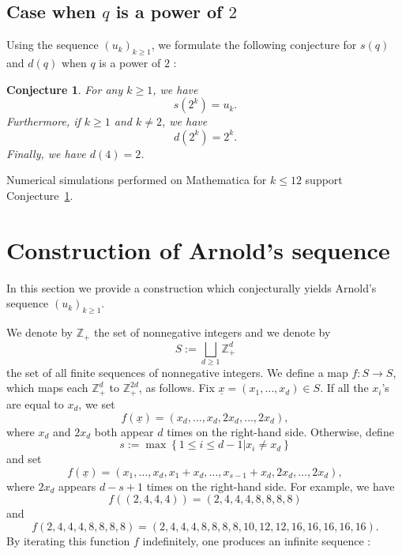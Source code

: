 \documentclass[12pt]{amsart}
\newcommand{\Z}{\mathbb Z}
\newtheorem{conj}{Conjecture}
\begin{document}
\subsection{Case when $q$ is a power of $2$}

Using the sequence $(u_k)_{k\geq1}$, we formulate the following conjecture for $s(q)$ and $d(q)$ when $q$ is a power of $2$ :

\begin{conj}
\label{conj:powersoftwo}
For any $k\geq 1$, we have
 \begin{equation}
 s(2^k)=u_k.
 \end{equation}
Furthermore, if $k\geq1$ and $k\neq2$, we have
\begin{equation}
d(2^k)= 2^k.
\end{equation}
Finally, we have $d(4)=2$.
\end{conj}
Numerical simulations performed on Mathematica for $k\leq 12$ support Conjecture~\ref{conj:powersoftwo}.

\section{Construction of Arnold's sequence}
\label{sec:Arnold}

In this section we provide a construction which conjecturally yields Arnold's sequence $(u_k)_{k\geq1}$.

We denote by $\Z_+$ the set of nonnegative integers and we denote by
\[
S:=\bigsqcup_{d\geq1}\Z_+^d
\]
the set of all finite sequences of nonnegative integers. We define a map $f:S\rightarrow S$, which maps each $\Z_+^d$ to $\Z_+^{2d}$, as follows. Fix $\underline{x}=(x_1,\ldots,x_d)\in S$. If all the $x_i$'s are equal to $x_d$, we set
\[
f(\underline{x})=(x_d,\ldots,x_d,2x_d,\ldots ,2x_d),
\]
where $x_d$ and $2x_d$ both appear $d$ times on the right-hand side.
Otherwise, define
\[
s:=\max \left\{ 1 \leq i \leq d-1 | x_i \neq x_d \right\}
\]
and set
\[
f(\underline{x})=(x_1,\ldots,x_d,x_1+x_d,\ldots,x_{s-1}+x_d,2x_d,\ldots,2x_d),
\]
where $2x_d$ appears $d-s+1$ times on the right-hand side.
For example, we have
\begin{equation}
f((2,4,4,4))=(2,4,4,4,8,8,8,8)
\end{equation}
and
\begin{equation}
f(2,4,4,4,8,8,8,8)=(2,4,4,4,8,8,8,8,10,12,12,16,16,16,16,16).
\end{equation}
By iterating this function $f$ indefinitely, one produces an infinite sequence :
\end{document}
